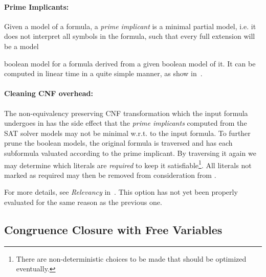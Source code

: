 \message{ !name(main.tex)}\documentclass{easychair}
\begin{document}
\paragraph{Prime Implicants:}

Given a model of a formula, a \emph{prime implicant} is a minimal
partial model, i.e. it does not interpret all symbols in the formula,
such that every full extension will be a model

 boolean model for a formula
derived from a given boolean model of it. It can be computed in linear
time in a quite simple manner, as show in~\cite{Deharbe2013}.

\paragraph{Cleaning CNF overhead:}

The non-equivalency preserving CNF transformation which the input
formula undergoes in {\verit} has the side effect that the \emph{prime
  implicants} computed from the SAT solver models may not be minimal
w.r.t. to the input formula. To further prune the boolean models, the
original formula is traversed and has each subformula valuated
according to the prime implicant. By traversing it again we may
determine which literals are \emph{required} to keep it
satisfiable\footnote{There are non-deterministic choices to be made
  that should be optimized eventually.}. All literals not marked as
required may then be removed from consideration from {\ccfv}.

For more details, see \emph{Relevancy} in~\cite{deMoura2007}. This
option has not yet been properly evaluated for the same reason as the
previous one.

\subsection{Congruence Closure with Free Variables}
\label{sec:ccfv}
\end{document}
